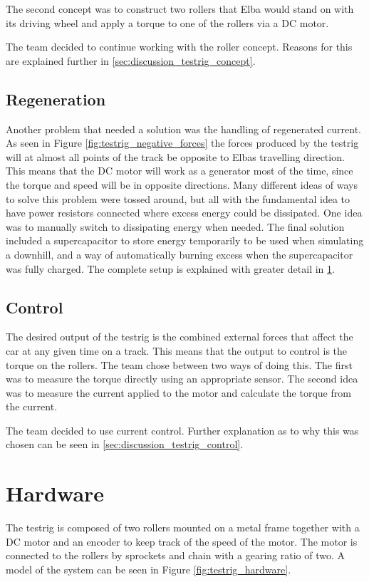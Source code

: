 The second concept was to construct two rollers that Elba would stand on with its driving wheel and apply a torque to one of the rollers via a DC motor.

The team decided to continue working with the roller concept. Reasons for this are explained further in \ref{sec:discussion_testrig_concept}.

\subsection{Regeneration}
Another problem that needed a solution was the handling of regenerated current. As seen in Figure \ref{fig:testrig_negative_forces} the forces produced by the testrig will at almost all points of the track be opposite to Elbas travelling direction. This means that the DC motor will work as a generator most of the time, since the torque and speed will be in opposite directions. Many different ideas of ways to solve this problem were tossed around, but all with the fundamental idea to have power resistors connected where excess energy could be dissipated. One idea was to manually switch to dissipating energy when needed. The final solution included a supercapacitor to store energy temporarily to be used when simulating a downhill, and a way of automatically burning excess when the supercapacitor was fully charged. The complete setup is explained with greater detail in \ref{sec:testrig_hardware}.

\subsection{Control}\label{sec:testrig_design_control}
The desired output of the testrig is the combined external forces that affect the car at any given time on a track. This means that the output to control is the torque on the rollers. The team chose between two ways of doing this. The first was to measure the torque directly using an appropriate sensor. The second idea was to measure the current applied to the motor and calculate the torque from the current. 

The team decided to use current control. Further explanation as to why this was chosen can be seen in \ref{sec:discussion_testrig_control}.

\section{Hardware}\label{sec:testrig_hardware}
The testrig is composed of two rollers mounted on a metal frame together with a
DC motor and an encoder to keep track of the speed
of the motor. The motor is connected to the rollers by sprockets and chain with
a gearing ratio of two. A model of the system can be seen in Figure \ref{fig:testrig_hardware}.

